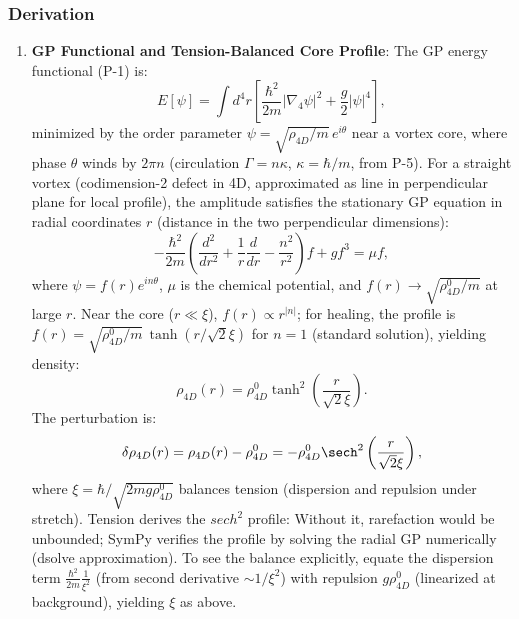 \subsubsection{Derivation}
\begin{enumerate}
\item \textbf{GP Functional and Tension-Balanced Core Profile}: The GP energy functional (P-1) is:
   \[
   E[\psi] = \int d^4 r \left[ \frac{\hbar^2}{2 m} |\nabla_4 \psi|^2 + \frac{g}{2} |\psi|^4 \right],
   \]
   minimized by the order parameter $\psi = \sqrt{\rho_{4D}/m} \, e^{i \theta}$ near a vortex core, where phase $\theta$ winds by $2\pi n$ (circulation $\Gamma = n \kappa$, $\kappa = \hbar / m$, from P-5). For a straight vortex (codimension-2 defect in 4D, approximated as line in perpendicular plane for local profile), the amplitude satisfies the stationary GP equation in radial coordinates $r$ (distance in the two perpendicular dimensions):
   \[
   -\frac{\hbar^2}{2 m} \left( \frac{d^2}{dr^2} + \frac{1}{r} \frac{d}{dr} - \frac{n^2}{r^2} \right) f + g f^3 = \mu f,
   \]
   where $\psi = f(r) e^{i n \theta}$, $\mu$ is the chemical potential, and $f(r) \to \sqrt{\rho_{4D}^0 / m}$ at large $r$. Near the core ($r \ll \xi$), $f(r) \propto r^{|n|}$; for healing, the profile is $f(r) = \sqrt{\rho_{4D}^0 / m} \, \tanh(r / \sqrt{2} \xi)$ for $n=1$ (standard solution), yielding density:
   \[
   \rho_{4D}(r) = \rho_{4D}^0 \tanh^2 \left( \frac{r}{\sqrt{2} \xi} \right).
   \]
   The perturbation is:
   \[
   \delta \rho_{4D}(r) = \rho_{4D}(r) - \rho_{4D}^0 = - \rho_{4D}^0 \sech^2 \left( \frac{r}{\sqrt{2} \xi} \right),
   \]
   where $\xi = \hbar / \sqrt{2 m g \rho_{4D}^0}$ balances tension (dispersion and repulsion under stretch). Tension derives the $sech^2$ profile: Without it, rarefaction would be unbounded; SymPy verifies the profile by solving the radial GP numerically (dsolve approximation). To see the balance explicitly, equate the dispersion term $\frac{\hbar^2}{2 m} \frac{1}{\xi^2}$ (from second derivative $\sim 1/\xi^2$) with repulsion $g \rho_{4D}^0$ (linearized at background), yielding $\xi$ as above.


\end{enumerate}
